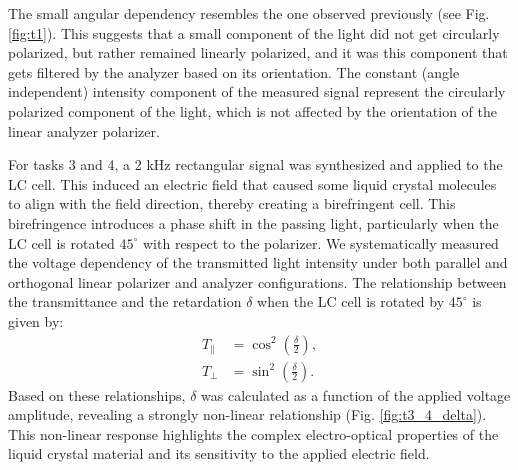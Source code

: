 \documentclass[12pt,a4paper]{article}
\begin{document}
 The small angular dependency resembles the one observed previously (see Fig. \ref{fig:t1}). This suggests that a small component of the light did not get circularly polarized, but rather remained linearly polarized, and it was this component that gets filtered by the analyzer based on its orientation.
 The constant (angle independent) intensity component of the measured signal represent the circularly polarized component of the light, which is not affected by the orientation of the linear analyzer polarizer.


For tasks 3 and 4, a 2 kHz rectangular signal was synthesized and applied to the LC cell. This induced an electric field that caused some liquid crystal molecules to align with the field direction, thereby creating a birefringent cell. This birefringence introduces a phase shift in the passing light, particularly when the LC cell is rotated \( 45^\circ \) with respect to the polarizer. We systematically measured the voltage dependency of the transmitted light intensity under both parallel and orthogonal linear polarizer and analyzer configurations. The relationship between the transmittance and the retardation \( \delta \) when the LC cell is rotated by \( 45^\circ \) is given by:
\begin{align*}
T_\parallel &= \cos^2\!\left(\frac{\delta}{2}\right),\\
T_\perp      &= \sin^2\!\left(\frac{\delta}{2}\right).
\end{align*}
Based on these relationships, \( \delta \) was calculated as a function of the applied voltage amplitude, revealing a strongly non-linear relationship (Fig. \ref{fig:t3_4_delta}). This non-linear response highlights the complex electro-optical properties of the liquid crystal material and its sensitivity to the applied electric field.
\end{document}

